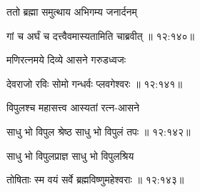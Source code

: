 {\devanagarifont ततो ब्रह्मा समुत्थाय अभिगम्य जनार्दनम् \thinspace{\dandab} \dontdisplaylinenum }%
     \var{{\devanagarifont \numemph\vab \lem \mssALL, 
\lk\lk \lk\lk \lk\lk \lk\lk \lk\lk \lk\lk \lk\lk \lk\lk\ \msNb}}%


{\devanagarifont गां च अर्घं च दत्त्वैवमास्यतामिति चाब्रवीत् {॥ १२:१४०॥} \veg\dontdisplaylinenum }%

{\devanagarifont मणिरत्नमये दिव्ये आसने गरुडध्वजः \thinspace{\dandab} \dontdisplaylinenum }%
 

{\devanagarifont देवराजो रविः सोमो गन्धर्वः प्लवगेश्वरः {॥ १२:१४१॥} \veg\dontdisplaylinenum }%

{\devanagarifont विपुलश्च महासत्त्व आस्यतां रत्न-आसने \thinspace{\dandab} \dontdisplaylinenum }%


{\devanagarifont साधु भो विपुल श्रेष्ठ साधु भो विपुलं तपः {॥ १२:१४२॥} \veg\dontdisplaylinenum }%

{\devanagarifont साधु भो विपुलप्राज्ञ साधु भो विपुलश्रिय \thinspace{\dandab} \dontdisplaylinenum }%


{\devanagarifont तोषिताः स्म वयं सर्वे ब्रह्मविष्णुमहेश्वराः {॥ १२:१४३॥} \veg\dontdisplaylinenum }%

